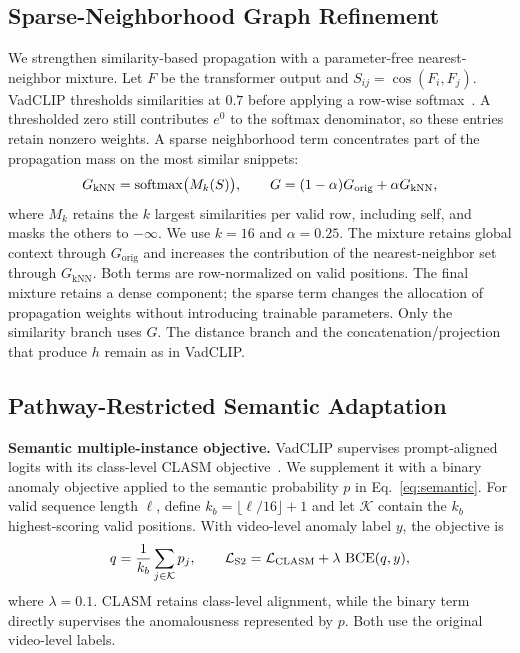 \subsection{Sparse-Neighborhood Graph Refinement}
We strengthen similarity-based propagation with a parameter-free nearest-neighbor mixture. Let $F$ be the transformer output and $S_{ij}=\cos(F_i,F_j)$. VadCLIP thresholds similarities at $0.7$ before applying a row-wise softmax~\cite{wu2024vadclip}. A thresholded zero still contributes $e^0$ to the softmax denominator, so these entries retain nonzero weights. A sparse neighborhood term concentrates part of the propagation mass on the most similar snippets:
\begin{equation}
 G_{\mathrm{kNN}}=\operatorname{softmax}\!\big(M_k(S)\big),\qquad
 G=(1-\alpha)G_{\mathrm{orig}}+\alpha G_{\mathrm{kNN}},
 \label{eq:graph}
\end{equation}
where $M_k$ retains the $k$ largest similarities per valid row, including self, and masks the others to $-\infty$. We use $k=16$ and $\alpha=0.25$. The mixture retains global context through $G_{\mathrm{orig}}$ and increases the contribution of the nearest-neighbor set through $G_{\mathrm{kNN}}$. Both terms are row-normalized on valid positions. The final mixture retains a dense component; the sparse term changes the allocation of propagation weights without introducing trainable parameters. Only the similarity branch uses $G$. The distance branch and the concatenation/projection that produce $h$ remain as in VadCLIP.

\subsection{Pathway-Restricted Semantic Adaptation}
\textbf{Semantic multiple-instance objective.}
VadCLIP supervises prompt-aligned logits with its class-level CLASM objective~\cite{wu2024vadclip}. We supplement it with a binary anomaly objective applied to the semantic probability $p$ in Eq.~\eqref{eq:semantic}. For valid sequence length $\ell$, define $k_b=\lfloor\ell/16\rfloor+1$ and let $\mathcal{K}$ contain the $k_b$ highest-scoring valid positions. With video-level anomaly label $y$, the objective is
\begin{equation}
 q=\frac{1}{k_b}\sum_{j\in\mathcal{K}}p_j,\qquad
 \mathcal{L}_{\mathrm{S2}}=\mathcal{L}_{\mathrm{CLASM}}+
 \lambda\,\operatorname{BCE}(q,y),
 \label{eq:loss}
\end{equation}
where $\lambda=0.1$. CLASM retains class-level alignment, while the binary term directly supervises the anomalousness represented by $p$. Both use the original video-level labels.

